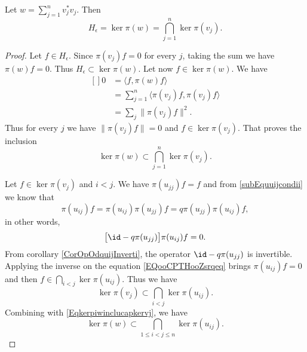 \begin{proposition}
	Let $w=\sum_{j=1}^nv_j^*v_j$. Then
	\begin{equation}
		H_{\epsilon}=\ker\pi(w)=\bigcap_{j=1}^n\ker\pi(v_j).
	\end{equation}
\end{proposition}

\begin{proof}
	Let $f\in H_{\epsilon}$. Since $\pi(v_j)f=0$ for every $j$, taking the sum we have $\pi(w)f=0$. Thus \( H_{\epsilon}\subset\ker\pi(w)\). Let now $f\in\ker\pi(w)$. We have
	\begin{equation}
		\begin{aligned}[]
			0 & =\langle f, \pi(w)f\rangle                       \\
			  & =\sum_{j=1}^n\langle \pi(v_j)f, \pi(v_j)f\rangle \\
			  & =\sum_j\| \pi(v_j)f \|^2.
		\end{aligned}
	\end{equation}
	Thus for every $j$ we have $\| \pi(v_j)f \|=0$ and $f\in\ker\pi(v_j)$. That proves the inclusion
	\begin{equation}        \label{Eqkerpiwinclucapkervj}
		\ker\pi(w)\subset\bigcap_{j=1}^n\ker\pi(v_j).
	\end{equation}

	Let $f\in\ker\pi(v_j)$ and \( i<j\). We have $\pi(u_{jj})f=f$ and from \eqref{subEquuijcondii} we know that
	\begin{equation}
		\pi(u_{ij})f=\pi(u_{ij})\pi(u_{jj})f=q\pi(u_{jj})\pi(u_{ij})f,
	\end{equation}
	in other words,
	\begin{equation}        \label{EQooCPTHooZsrqeq}
		\big[ \id-q\pi(u_{jj}) \big]\pi(u_{ij})f=0.
	\end{equation}
	From corollary \ref{CorOpOdquijInverti}, the operator $\id-q\pi(u_{jj})$ is invertible. Applying the inverse on the equation \eqref{EQooCPTHooZsrqeq} brings $\pi(u_{ij})f=0$ and then $f\in\bigcap_{i<j}\ker\pi(u_{ij})$. Thus we have
	\begin{equation}        \label{Eqketpivjsubipyjketpiuij}
		\ker\pi(v_j)\subset\bigcap_{i<j}\ker\pi(u_{ij}).
	\end{equation}
	Combining with \eqref{Eqkerpiwinclucapkervj}, we have
	\begin{equation}        \label{EqIntSubSintkerkera}
		\ker\pi(w)\subset\bigcap_{1\leq i<j\leq n}\ker\pi(u_{ij}).
	\end{equation}


\end{proof}
